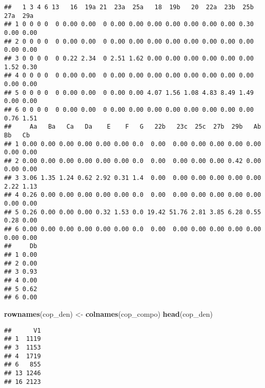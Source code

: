\documentclass[
]{article}
\newenvironment{Shaded}{\begin{snugshade}}{\end{snugshade}}
\newcommand{\FunctionTok}[1]{\textcolor[rgb]{0.13,0.29,0.53}{\textbf{#1}}}
\newcommand{\NormalTok}[1]{#1}
\newcommand{\OtherTok}[1]{\textcolor[rgb]{0.56,0.35,0.01}{#1}}
\begin{document}
\begin{verbatim}
##   1 3 4 6 13   16  19a 21  23a  25a   18  19b   20  22a  23b  25b  27a  29a
## 1 0 0 0 0  0 0.00 0.00  0 0.00 0.00 0.00 0.00 0.00 0.00 0.00 0.30 0.00 0.00
## 2 0 0 0 0  0 0.00 0.00  0 0.00 0.00 0.00 0.00 0.00 0.00 0.00 0.00 0.00 0.00
## 3 0 0 0 0  0 0.22 2.34  0 2.51 1.62 0.00 0.00 0.00 0.00 0.00 0.00 1.52 0.30
## 4 0 0 0 0  0 0.00 0.00  0 0.00 0.00 0.00 0.00 0.00 0.00 0.00 0.00 0.00 0.00
## 5 0 0 0 0  0 0.00 0.00  0 0.00 0.00 4.07 1.56 1.08 4.83 8.49 1.49 0.00 0.00
## 6 0 0 0 0  0 0.00 0.00  0 0.00 0.00 0.00 0.00 0.00 0.00 0.00 0.00 0.76 1.51
##     Aa   Ba   Ca   Da    E    F   G   22b   23c  25c  27b  29b   Ab   Bb   Cb
## 1 0.00 0.00 0.00 0.00 0.00 0.00 0.0  0.00  0.00 0.00 0.00 0.00 0.00 0.00 0.00
## 2 0.00 0.00 0.00 0.00 0.00 0.00 0.0  0.00  0.00 0.00 0.00 0.42 0.00 0.00 0.00
## 3 3.06 1.35 1.24 0.62 2.92 0.31 1.4  0.00  0.00 0.00 0.00 0.00 0.00 2.22 1.13
## 4 0.26 0.00 0.00 0.00 0.00 0.00 0.0  0.00  0.00 0.00 0.00 0.00 0.00 0.00 0.00
## 5 0.26 0.00 0.00 0.00 0.32 1.53 0.0 19.42 51.76 2.81 3.85 6.28 0.55 0.28 0.00
## 6 0.00 0.00 0.00 0.00 0.00 0.00 0.0  0.00  0.00 0.00 0.00 0.00 0.00 0.00 0.00
##     Db
## 1 0.00
## 2 0.00
## 3 0.93
## 4 0.00
## 5 0.62
## 6 0.00
\end{verbatim}

\begin{Shaded}
\begin{Highlighting}[]
\FunctionTok{rownames}\NormalTok{(cop\_den) }\OtherTok{\textless{}{-}} \FunctionTok{colnames}\NormalTok{(cop\_compo)}
\FunctionTok{head}\NormalTok{(cop\_den)}
\end{Highlighting}
\end{Shaded}

\begin{verbatim}
##      V1
## 1  1119
## 3  1153
## 4  1719
## 6   855
## 13 1246
## 16 2123
\end{verbatim}
\end{document}
